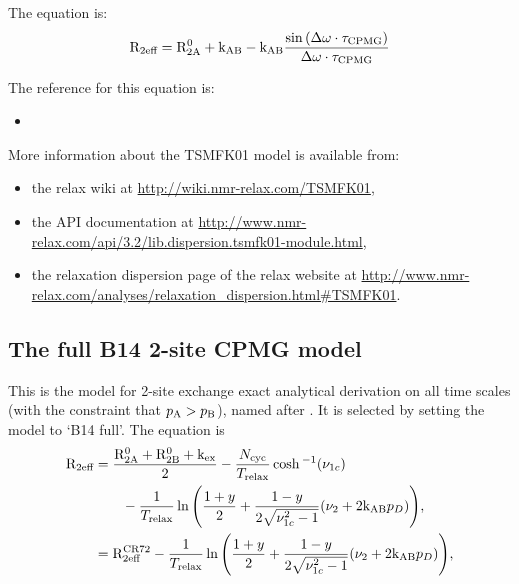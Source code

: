 The equation is:
\begin{equation}
    \mathrm{R}_{\textrm{2eff}} = \mathrm{R}_{\mathrm{2A}}^0 + \textrm{k}_{\textrm{AB}} - \textrm{k}_{\textrm{AB}} \frac{\sin{(\Delta\omega\cdot \tau_{\textrm{CPMG}})}}{\Delta\omega \cdot \tau_{\textrm{CPMG}}}
\end{equation}

The reference for this equation is:
\begin{itemize}
  \item {}
\end{itemize}

More information about the TSMFK01 model is available from:
\begin{itemize}
  \item the relax wiki at \url{http://wiki.nmr-relax.com/TSMFK01},
  \item the API documentation at \url{http://www.nmr-relax.com/api/3.2/lib.dispersion.tsmfk01-module.html},
  \item the relaxation dispersion page of the relax website at \url{http://www.nmr-relax.com/analyses/relaxation\_dispersion.html#TSMFK01}.
\end{itemize}



\subsection{The full B14 2-site CPMG model}
\label{sect: dispersion: B14 full model}

This is the model for 2-site exchange exact analytical derivation on all time scales (with the constraint that $p_{\textrm{A}} > p_{\textrm{B}}$), named after \citet{Baldwin2014}.
It is selected by setting the model to `B14 full'.
The equation is
\begin{subequations}
\begin{align}
  \mathrm{R}_{\textrm{2eff}} & = \frac{\mathrm{R}_{\mathrm{2A}}^0 + \mathrm{R}_{\mathrm{2B}}^0 + \textrm{k}_{\textrm{ex}}}{2}-\frac{N_{\textrm{cyc}}}{T_{\textrm{relax}}} \cosh{}^{-1}(\nu_{1c}) \nonumber \\
           & \qquad - \frac{1}{T_{\textrm{relax}}}\ln{\left(\frac{1+y}{2} + \frac{1-y}{2\sqrt{\nu_{1c}^2-1}}(\nu_2 + 2\textrm{k}_{\textrm{AB}}p_D)\right)} , \\
    & = \mathrm{R}_{\textrm{2eff}}^{\textrm{CR72}} - \frac{1}{T_{\textrm{relax}}}\ln{\left(\frac{1+y}{2} + \frac{1-y}{2\sqrt{\nu_{1c}^2-1}}(\nu_2 + 2\textrm{k}_{\textrm{AB}}p_D)\right)} ,
\end{align}
\end{subequations}


